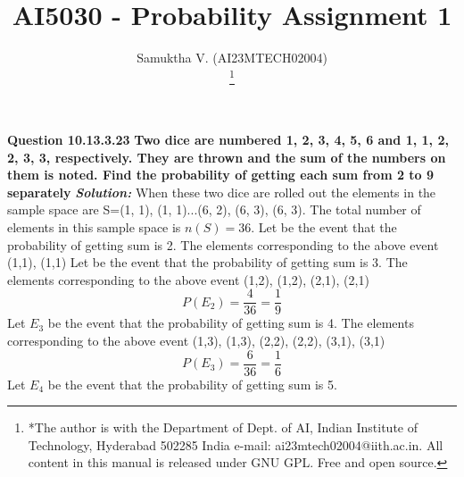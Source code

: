 \documentclass[journal,12pt,twocolumn]{IEEEtran}
\begin{document}
\vspace{3cm}

\title{
AI5030 - Probability Assignment 1
}
\author{ Samuktha V. (AI23MTECH02004)

	\thanks{*The author is with the Department
		of Dept. of AI, Indian Institute of Technology, Hyderabad
		502285 India e-mail:  ai23mtech02004@iith.ac.in. All content in this manual is released under GNU GPL.  Free and open source.}
}

\maketitle

\newpage


\textbf{Question 10.13.3.23 }
\newline
\textbf{Two dice are numbered 1, 2, 3, 4, 5, 6 and 1, 1, 2, 2, 3, 3, respectively. They are
thrown and the sum of the numbers on them is noted. Find the probability of getting
each sum from 2 to 9 separately }
\newline
\newline
\textbf{\emph{Solution:}}
\newline
\newline
{ When these two dice are rolled out the elements in the sample space are S={(1, 1), (1, 1)...(6, 2), (6, 3), (6, 3)}. The total number of elements in this sample space is \(n(S)=36\).}
\newline
\newline
{Let  be the event that the probability of getting sum is 2.}
{The elements corresponding to the above event {(1,1), (1,1)}}
\boldmath{\[P(E_{1})=\frac{2}{36} = \frac{1}{18} \] }
\newline
{Let  be the event that the probability of getting sum is 3.}
{The elements corresponding to the above event {(1,2), (1,2), (2,1), (2,1) }}
\[P(E_{2})=\frac{4}{36} = \frac{1}{9} \] 
\newline
{Let \textbf{$E_{3}$} be the event that the probability of getting sum is 4.}
{The elements corresponding to the above event {(1,3), (1,3), (2,2), (2,2), (3,1), (3,1) }}
\[P(E_{3})=\frac{6}{36} = \frac{1}{6} \] 
\newline
{Let \textbf{$E_{4}$} be the event that the probability of getting sum is 5.}
\end{document}
